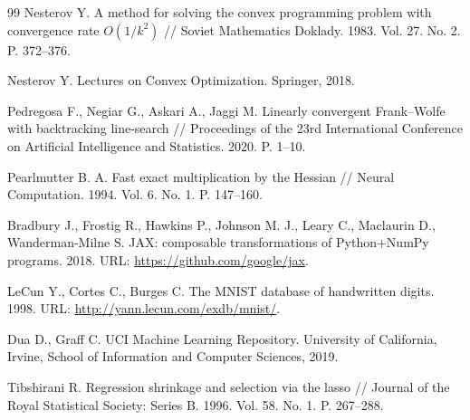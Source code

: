 \begin{thebibliography}{99}
Nesterov Y. A method for solving the convex programming problem with convergence rate $O(1/k^2)$ // Soviet Mathematics Doklady. 1983. Vol. 27. No. 2. P. 372--376.

Nesterov Y. Lectures on Convex Optimization. Springer, 2018.

Pedregosa F., Negiar G., Askari A., Jaggi M. Linearly convergent Frank--Wolfe with backtracking line-search // Proceedings of the 23rd International Conference on Artificial Intelligence and Statistics. 2020. P. 1--10.

Pearlmutter B. A. Fast exact multiplication by the Hessian // Neural Computation. 1994. Vol. 6. No. 1. P. 147--160.

Bradbury J., Frostig R., Hawkins P., Johnson M. J., Leary C., Maclaurin D., Wanderman-Milne S. JAX: composable transformations of Python+NumPy programs. 2018. URL: \url{https://github.com/google/jax}.

LeCun Y., Cortes C., Burges C. The MNIST database of handwritten digits. 1998. URL: \url{http://yann.lecun.com/exdb/mnist/}.

Dua D., Graff C. UCI Machine Learning Repository. University of California, Irvine, School of Information and Computer Sciences, 2019.

Tibshirani R. Regression shrinkage and selection via the lasso // Journal of the Royal Statistical Society: Series B. 1996. Vol. 58. No. 1. P. 267--288.

\end{thebibliography}
\endgroup
\setcounter{secnumdepth}{3}

